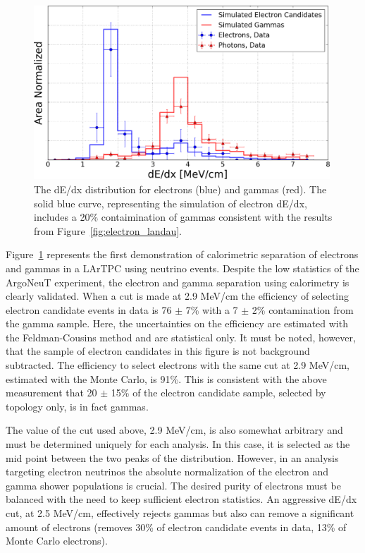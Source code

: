 \begin{figure}[htbp]
  \centering
  \includegraphics[width=0.99\textwidth]{emshower_figures/median_dedx_trimmed.png}
  \caption[Calorimetric dE/dx Distribution]{The dE/dx distribution for electrons (blue) and gammas (red).  The solid blue curve, representing the simulation of electron dE/dx, includes a 20\% contaimination of gammas consistent with the results from Figure~\ref{fig:electron_landau}.}
  \label{fig:dEdx}
\end{figure}


Figure~\ref{fig:dEdx} represents the first demonstration of calorimetric separation of electrons and gammas in a LArTPC using neutrino events.  Despite the low statistics of the ArgoNeuT experiment, the electron and gamma separation using calorimetry is clearly validated. When a cut is made at 2.9 MeV/cm the efficiency of selecting electron candidate events in data is 76 $\pm$ 7\% with a 7 $\pm$ 2\% contamination from the gamma sample. Here, the uncertainties on the efficiency are estimated with the Feldman-Cousins method \cite{Feldman:1997qc} and are statistical only.  It must be noted, however, that the sample of electron candidates in this figure is not background subtracted.  The efficiency to select electrons with the same cut at 2.9 MeV/cm, estimated with the Monte Carlo, is 91\%.  This is consistent with the above measurement that 20 $\pm$ 15\% of the electron candidate sample, selected by topology only, is in fact gammas.


The value of the cut used above, 2.9 MeV/cm, is also somewhat arbitrary and must be determined uniquely for each analysis.  In this case, it is selected as the mid point between the two peaks of the distribution.  However, in an analysis targeting electron neutrinos the absolute normalization of the electron and gamma shower populations is crucial.  The desired purity of electrons must be balanced with the need to keep sufficient electron statistics.  An aggressive dE/dx cut, at 2.5 MeV/cm, effectively rejects gammas but also can remove a significant amount of electrons (removes 30\% of electron candidate events in data, 13\% of Monte Carlo electrons).  


